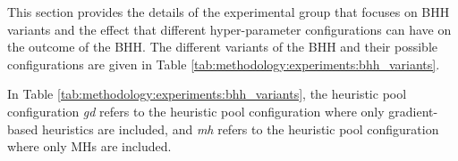 This section provides the details of the experimental group that focuses on \acs{BHH} variants and the effect that different hyper-parameter configurations can have on the outcome of the \acs{BHH}. The different variants of the \acs{BHH} and their possible configurations are given in Table \ref{tab:methodology:experiments:bhh_variants}.

\begin{table}[htb]
      \centering
      \caption{BHH variants and their configuration}
      \label{tab:methodology:experiments:bhh_variants}%
      \par\bigskip
\end{table}%

In Table \ref{tab:methodology:experiments:bhh_variants}, the heuristic pool configuration \textit{gd} refers to the heuristic pool configuration where only gradient-based heuristics are included, and \textit{mh} refers to the heuristic pool configuration where only \acp{MH} are included.

